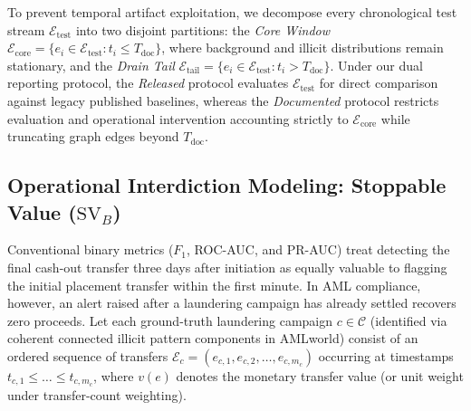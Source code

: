 \documentclass[pdflatex,sn-mathphys,Numbered]{sn-jnl}
\theoremstyle{thmstyleone}
\begin{document}
To prevent temporal artifact exploitation, we decompose every chronological test stream $\mathcal{E}_{\text{test}}$ into two disjoint partitions: the \emph{Core Window} $\mathcal{E}_{\text{core}} = \{ e_i \in \mathcal{E}_{\text{test}} : t_i \le T_{\text{doc}} \}$, where background and illicit distributions remain stationary, and the \emph{Drain Tail} $\mathcal{E}_{\text{tail}} = \{ e_i \in \mathcal{E}_{\text{test}} : t_i > T_{\text{doc}} \}$. Under our dual reporting protocol, the \emph{Released} protocol evaluates $\mathcal{E}_{\text{test}}$ for direct comparison against legacy published baselines, whereas the \emph{Documented} protocol restricts evaluation and operational intervention accounting strictly to $\mathcal{E}_{\text{core}}$ while truncating graph edges beyond $T_{\text{doc}}$.

\subsection{Operational Interdiction Modeling: Stoppable Value ($\text{SV}_B$)}\label{sec:stoppable_value}

Conventional binary metrics ($F_1$, ROC-AUC, and PR-AUC) treat detecting the final cash-out transfer three days after initiation as equally valuable to flagging the initial placement transfer within the first minute. In AML compliance, however, an alert raised after a laundering campaign has already settled recovers zero proceeds. Let each ground-truth laundering campaign $c \in \mathcal{C}$ (identified via coherent connected illicit pattern components in AMLworld) consist of an ordered sequence of transfers $\mathcal{E}_c = (e_{c,1}, e_{c,2}, \dots, e_{c,m_c})$ occurring at timestamps $t_{c,1} \le \dots \le t_{c,m_c}$, where $v(e)$ denotes the monetary transfer value (or unit weight under transfer-count weighting).
\end{document}
